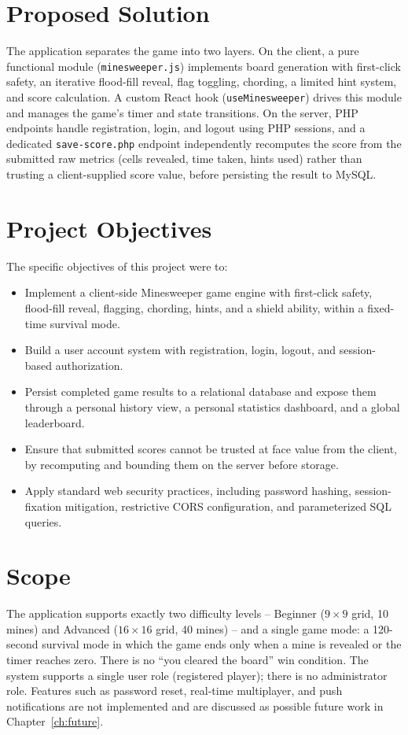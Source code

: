 \section{Proposed Solution}
The application separates the game into two layers. On the client, a pure
functional module (\texttt{minesweeper.js}) implements board generation with
first-click safety, an iterative flood-fill reveal, flag toggling, chording,
a limited hint system, and score calculation. A custom React hook
(\texttt{useMinesweeper}) drives this module and manages the game's timer and
state transitions. On the server, PHP endpoints handle registration, login,
and logout using PHP sessions, and a dedicated \texttt{save-score.php}
endpoint independently recomputes the score from the submitted raw metrics
(cells revealed, time taken, hints used) rather than trusting a
client-supplied score value, before persisting the result to MySQL.

\section{Project Objectives}
The specific objectives of this project were to:
\begin{itemize}[nosep]
    \item Implement a client-side Minesweeper game engine with first-click
    safety, flood-fill reveal, flagging, chording, hints, and a shield
    ability, within a fixed-time survival mode.
    \item Build a user account system with registration, login, logout, and
    session-based authorization.
    \item Persist completed game results to a relational database and expose
    them through a personal history view, a personal statistics dashboard,
    and a global leaderboard.
    \item Ensure that submitted scores cannot be trusted at face value from
    the client, by recomputing and bounding them on the server before
    storage.
    \item Apply standard web security practices, including password hashing,
    session-fixation mitigation, restrictive CORS configuration, and
    parameterized SQL queries.
\end{itemize}

\section{Scope}
The application supports exactly two difficulty levels -- Beginner
($9\times9$ grid, 10 mines) and Advanced ($16\times16$ grid, 40 mines) -- and
a single game mode: a 120-second survival mode in which the game ends only
when a mine is revealed or the timer reaches zero. There is no ``you cleared
the board'' win condition. The system supports a single user role (registered
player); there is no administrator role. Features such as password reset,
real-time multiplayer, and push notifications are not implemented and are
discussed as possible future work in Chapter~\ref{ch:future}.
